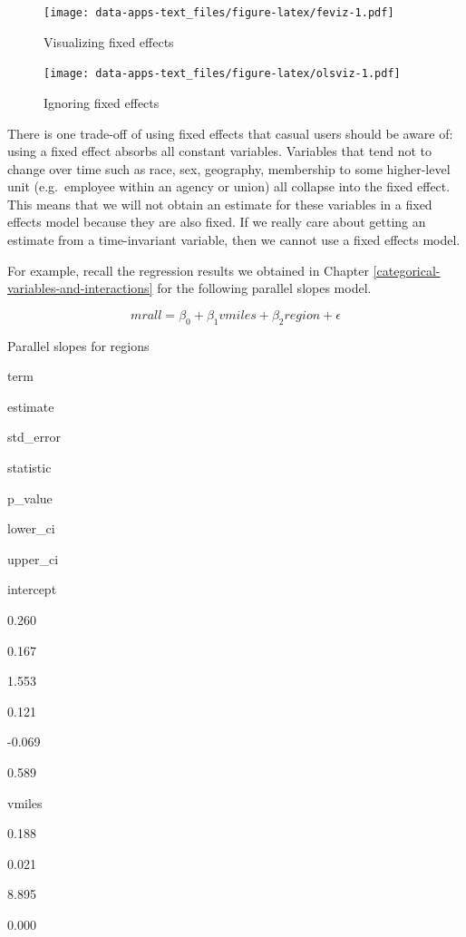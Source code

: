 \documentclass[
]{book}
\begin{document}
\begin{figure}
\centering
\texttt{[image: data-apps-text\_files/figure-latex/feviz-1.pdf]}
\caption{\label{fig:feviz}Visualizing fixed effects}
\end{figure}

\begin{figure}
\centering
\texttt{[image: data-apps-text\_files/figure-latex/olsviz-1.pdf]}
\caption{\label{fig:olsviz}Ignoring fixed effects}
\end{figure}

There is one trade-off of using fixed effects that casual users should be aware of: using a fixed effect absorbs all constant variables. Variables that tend not to change over time such as race, sex, geography, membership to some higher-level unit (e.g.~employee within an agency or union) all collapse into the fixed effect. This means that we will not obtain an estimate for these variables in a fixed effects model because they are also fixed. If we really care about getting an estimate from a time-invariant variable, then we cannot use a fixed effects model.

For example, recall the regression results we obtained in Chapter \ref{categorical-variables-and-interactions} for the following parallel slopes model.

\begin{equation}
mrall = \beta_0 + \beta_1vmiles + \beta_2region + \epsilon
\label{eq:pslopeexamp2rep}
\end{equation}

\label{tab:psloperesults2rep}Parallel slopes for regions

term

estimate

std\_error

statistic

p\_value

lower\_ci

upper\_ci

intercept

0.260

0.167

1.553

0.121

-0.069

0.589

vmiles

0.188

0.021

8.895

0.000
\end{document}
